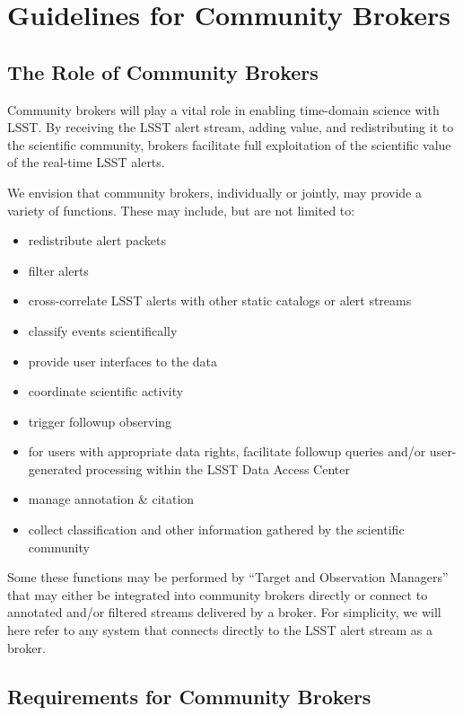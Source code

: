 \section{Guidelines for Community Brokers}\label{sec:community_brokers}

\subsection{The Role of Community Brokers}

Community brokers will play a vital role in enabling time-domain science with LSST.
By receiving the LSST alert stream, adding value, and redistributing it to the scientific community, brokers facilitate full exploitation of the scientific value of the real-time LSST alerts.

We envision that community brokers, individually or jointly, may provide a variety of functions.  These may include, but are not limited to:

\begin{itemize}
	\item redistribute alert packets
	\item filter alerts
	\item cross-correlate LSST alerts with other static catalogs or alert streams
	\item classify events scientifically
	\item provide user interfaces to the data
	\item coordinate scientific activity 
	\item trigger followup observing
	\item for users with appropriate data rights, facilitate followup queries and/or user-generated processing within the LSST Data Access Center
	\item manage annotation \& citation 
	\item collect classification and other information gathered by the scientific community
\end{itemize}

Some these functions may be performed by ``Target and Observation Managers'' that may either be integrated into community brokers directly or connect to annotated and/or filtered streams delivered by a broker.
For simplicity, we will here refer to any system that connects directly to the LSST alert stream as a broker.

\subsection{Requirements for Community Brokers}

